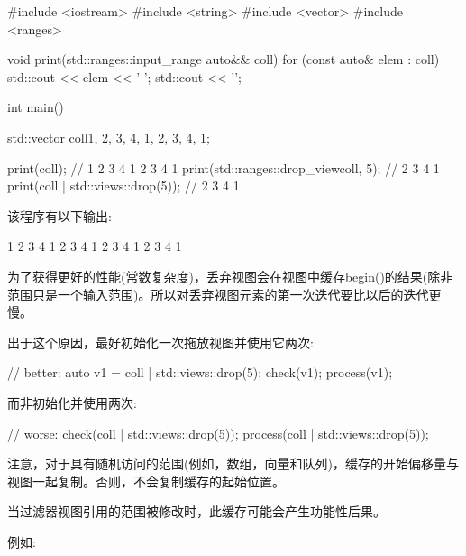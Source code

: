 
\begin{cpp}
#include <iostream>
#include <string>
#include <vector>
#include <ranges>

void print(std::ranges::input_range auto&& coll)
{
	for (const auto& elem : coll) {
		std::cout << elem << ' ';
	}
	std::cout << '\n';
}

int main()
{
	std::vector coll{1, 2, 3, 4, 1, 2, 3, 4, 1};
	
	print(coll); // 1 2 3 4 1 2 3 4 1
	print(std::ranges::drop_view{coll, 5}); // 2 3 4 1
	print(coll | std::views::drop(5)); // 2 3 4 1
}
\end{cpp}

该程序有以下输出:

\begin{shell}
1 2 3 4 1 2 3 4 1
2 3 4 1
2 3 4 1
\end{shell}


为了获得更好的性能(常数复杂度)，丢弃视图会在视图中缓存begin()的结果(除非范围只是一个输入范围)。所以对丢弃视图元素的第一次迭代要比以后的迭代更慢。

出于这个原因，最好初始化一次拖放视图并使用它两次:

\begin{cpp}
// better:
auto v1 = coll | std::views::drop(5);
check(v1);
process(v1);
\end{cpp}

而非初始化并使用两次:

\begin{cpp}
// worse:
check(coll | std::views::drop(5));
process(coll | std::views::drop(5));
\end{cpp}

注意，对于具有随机访问的范围(例如，数组，向量和队列)，缓存的开始偏移量与视图一起复制。否则，不会复制缓存的起始位置。

当过滤器视图引用的范围被修改时，此缓存可能会产生功能性后果。

例如:


